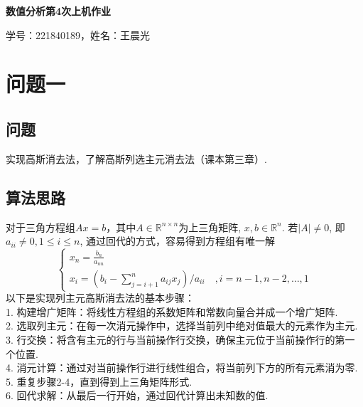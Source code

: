 \documentclass[UTF8,ctexart,a4paper,11pt,openany]{article}
\theoremstyle{definition}
\begin{document}
\begin{center}
{\huge \textbf{数值分析第4次上机作业}}

{\large 学号：221840189，姓名：王晨光}
\end{center}

\section{问题一}
    \subsection{问题}
    实现高斯消去法，了解高斯列选主元消去法（课本第三章）.
    \subsection{算法思路}
    对于三角方程组$Ax=b$，其中$A\in \mathbb{R}^{n\times n}$为上三角矩阵, $x,b\in \mathbb{R}^{n}$. 若$|A|\neq 0$, 即$a_{ii}\neq 0,1\leqslant i\leqslant n$, 通过回代的方式，容易得到方程组有唯一解$$\left\{\begin{array}{l}x_{n}=\frac{b_{n}}{a_{n n}} \\ x_{i}=\left(b_{i}-\sum_{j=i+1}^{n} a_{i j} x_{j}\right) / a_{i i} \quad, i=n-1, n-2, \dots, 1\end{array}\right.$$以下是实现列主元高斯消去法的基本步骤：\\
    1. 构建增广矩阵：将线性方程组的系数矩阵和常数向量合并成一个增广矩阵. \\
    2. 选取列主元：在每一次消元操作中，选择当前列中绝对值最大的元素作为主元. \\
    3. 行交换：将含有主元的行与当前操作行交换，确保主元位于当前操作行的第一个位置. \\
    4. 消元计算：通过对当前操作行进行线性组合，将当前列下方的所有元素消为零. \\
    5. 重复步骤2-4，直到得到上三角矩阵形式. \\
    6. 回代求解：从最后一行开始，通过回代计算出未知数的值.
\end{document}
